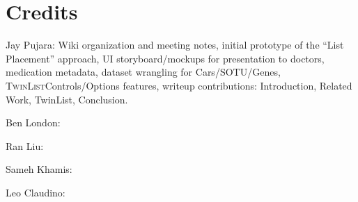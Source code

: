 \documentclass{chi2009}
\newcommand{\TwinList}{\textsc{TwinList}}
\begin{document}



\section{Credits}
\begin{description}
\item{Jay Pujara:} Wiki organization and meeting notes, initial prototype of the ``List Placement'' approach, UI storyboard/mockups for presentation to doctors, medication metadata, dataset wrangling for Cars/SOTU/Genes, \TwinList Controls/Options features, writeup contributions: Introduction, Related Work, TwinList, Conclusion.
\item{Ben London:}
\item{Ran Liu:}
\item{Sameh Khamis:}
\item{Leo Claudino:}
\end{description}
\end{document}
